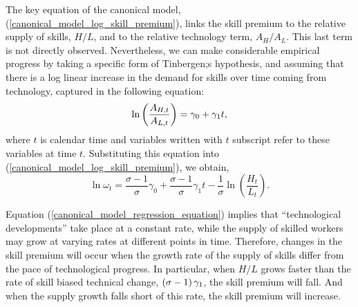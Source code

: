 \documentclass[12pt]{article}
\theoremstyle{definition}
\begin{document}
The key equation of the canonical model, (\ref{canonical_model_log_skill_premium}), links the skill premium to the relative supply of skills, $H/L$, and to the relative technology term, $A_H / A_L$. This last term is not directly observed. Nevertheless, we can make considerable empirical progress by taking a specific form of Tinbergen;s hypothesis, and assuming that there is a log linear increase in the demand for skills over time coming from technology, captured in the following equation:
\begin{equation}
    \label{canonical_model_empirical_assumption}
    \ln \of{\frac{A_{H,t}}{A_{L,t}}} = \g_0 + \g_1 t,
\end{equation}
where $t$ is calendar time and variables written with $t$ subscript refer to these variables at time $t$. Substituting this equation into (\ref{canonical_model_log_skill_premium}), we obtain, 
\begin{equation}
    \label{canonical_model_regression_equation}
    \ln \omega_t=\frac{\sigma-1}{\sigma} \gamma_0+\frac{\sigma-1}{\sigma} \gamma_1 t-\frac{1}{\sigma} \ln \left(\frac{H_t}{L_t}\right) .
\end{equation}

Equation (\ref{canonical_model_regression_equation}) implies that ``technological developments'' take place at a constant rate, while the supply of skilled workers may grow at varying rates at different points in time. Therefore, changes in the skill premium will occur when the growth rate of the supply of skills differ from the pace of technological progress. In particular, when $H/L$ grows faster than the rate of skill biased technical change, $\left( \sigma-1 \right)\gamma_1$, the skill premium will fall. And when the supply growth falls short of this rate, the skill premium will increase. 
\end{document}
